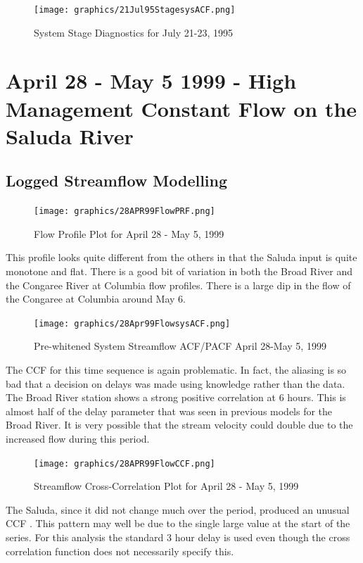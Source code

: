 \documentclass[12pt]{report}
\begin{document}
\begin{figure}[h]
\centering\texttt{[image: graphics/21Jul95StagesysACF.png]}
\centering\caption{System Stage Diagnostics for July 21-23,
1995}\label{fig:julssysapcf}
\end{figure}


\clearpage

\section{April 28 - May 5 1999 - High Management Constant Flow on the Saluda
River}
\subsection{Logged Streamflow Modelling}
\begin{figure}[h]
\centering\texttt{[image: graphics/28APR99FlowPRF.png]}
\centering\caption{Flow Profile Plot for April 28 - May 5, 1999}
\end{figure}
This profile looks quite different from the others in that the
Saluda input is quite monotone and flat.  There is a good bit of
variation in both the Broad River and the Congaree River at
Columbia flow profiles.  There is a large dip in the flow of the
Congaree at Columbia around May 6.

\begin{figure}[h]
\centering\texttt{[image: graphics/28Apr99FlowsysACF.png]}
\centering\caption{Pre-whitened System Streamflow ACF/PACF April
28-May 5, 1999}
\end{figure}

The CCF for this time sequence is again problematic. In fact, the
aliasing is so bad that a decision on delays was made using
knowledge rather than the data.  The Broad River station shows a
strong positive correlation at 6 hours.  This is almost half of
the delay parameter that was seen in previous models for the Broad
River.  It is very possible that the stream velocity could double
due to the increased flow during this period.

\begin{figure}[h]
\centering\texttt{[image: graphics/28APR99FlowCCF.png]}
\centering\caption{Streamflow Cross-Correlation Plot for April 28
- May 5, 1999}
\end{figure}

The Saluda, since it did not change much over the period, produced
an unusual CCF . This pattern may well be due to the single large
value at the start of the series. For this analysis the standard 3
hour delay is used even though the cross correlation function does
not necessarily specify this.
\end{document}
